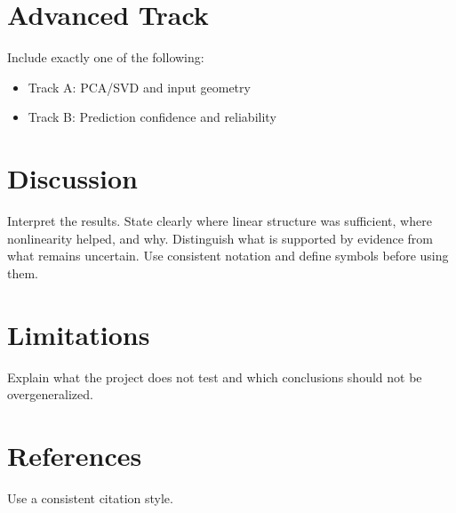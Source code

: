 \documentclass[11pt]{article}
\begin{document}
\section{Advanced Track}
Include exactly one of the following:
\begin{itemize}[leftmargin=1.4em]
    \item Track A: PCA/SVD and input geometry
    \item Track B: Prediction confidence and reliability
\end{itemize}

\section{Discussion}
Interpret the results. State clearly where linear structure was sufficient, where nonlinearity helped, and why. Distinguish what is supported by evidence from what remains uncertain. Use consistent notation and define symbols before using them.

\section{Limitations}
Explain what the project does not test and which conclusions should not be overgeneralized.

\section*{References}
Use a consistent citation style.
\end{document}
